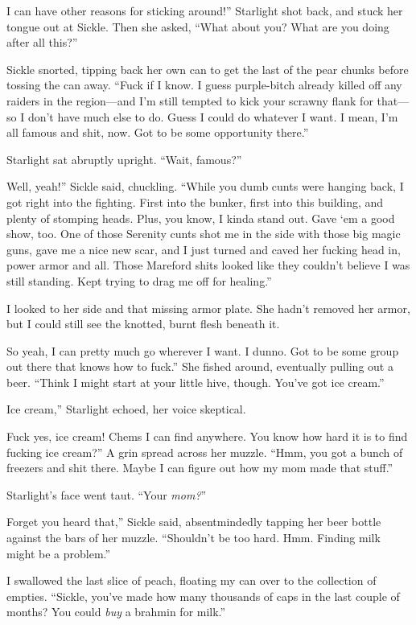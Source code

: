 \leavevmode{}I can have other reasons for sticking around!” Starlight shot back, and stuck her tongue out at Sickle. Then she asked, “What about you? What are you doing after all this?”

Sickle snorted, tipping back her own can to get the last of the pear chunks before tossing the can away. “Fuck if I know. I guess purple-bitch already killed off any raiders in the region—and I’m still tempted to kick your scrawny flank for that—so I don’t have much else to do. Guess I could do whatever I want. I mean, I’m all famous and shit, now. Got to be some opportunity there.”

Starlight sat abruptly upright. “Wait, famous?”

\leavevmode{}Well, yeah!” Sickle said, chuckling. “While you dumb cunts were hanging back, I got right into the fighting. First into the bunker, first into this building, and plenty of stomping heads. Plus, you know, I kinda stand out. Gave ‘em a good show, too. One of those Serenity cunts shot me in the side with those big magic guns, gave me a nice new scar, and I just turned and caved her fucking head in, power armor and all. Those Mareford shits looked like they couldn’t believe I was still standing. Kept trying to drag me off for healing.”

I looked to her side and that missing armor plate. She hadn’t removed her armor, but I could still see the knotted, burnt flesh beneath it.

\leavevmode{}So yeah, I can pretty much go wherever I want. I dunno. Got to be some group out there that knows how to fuck.” She fished around, eventually pulling out a beer. “Think I might start at your little hive, though. You’ve got ice cream.”

\leavevmode{}Ice cream,” Starlight echoed, her voice skeptical.

\leavevmode{}Fuck yes, ice cream! Chems I can find anywhere. You know how hard it is to find fucking ice cream?” A grin spread across her muzzle. “Hmm, you got a bunch of freezers and shit there. Maybe I can figure out how my mom made that stuff.”

Starlight’s face went taut. “Your \textit{mom?}”

\leavevmode{}Forget you heard that,” Sickle said, absentmindedly tapping her beer bottle against the bars of her muzzle. “Shouldn’t be too hard. Hmm. Finding milk might be a problem.”

I swallowed the last slice of peach, floating my can over to the collection of empties. “Sickle, you’ve made how many thousands of caps in the last couple of months? You could \textit{buy} a brahmin for milk.”


